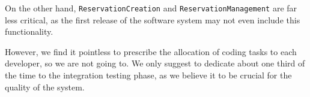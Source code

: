 On the other hand, \texttt{Res\-er\-va\-tion\-Cre\-ation} and \texttt{Res\-er\-va\-tion\-Man\-age\-ment} are far less critical, as the first release of the software system may not even include this functionality. 

However, we find it pointless to prescribe the allocation of coding tasks to each developer, so we are not going to. We only suggest to dedicate about one third of the time to the integration testing phase, as we believe it to be crucial for the quality of the system.















